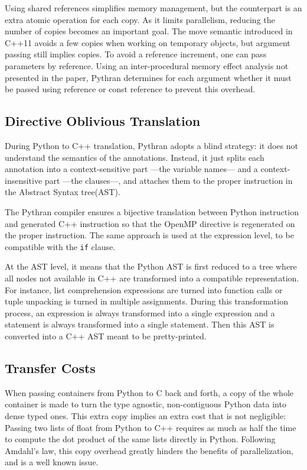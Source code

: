 \documentclass[conference]{IEEEtran}
\begin{document}
Using shared references simplifies memory management, but the counterpart is an
extra atomic operation for each copy. As it limits parallelism, reducing the
number of copies becomes an important goal. The move semantic introduced in
C++11 avoids a few copies when working on temporary objects, but argument
passing still implies copies. To avoid a reference increment, one can pass
parameters by reference. Using an inter-procedural memory effect analysis not
presented in the paper, Pythran determines for each argument whether it must be
passed using reference or const reference to prevent this overhead.

\subsection{Directive Oblivious Translation}

During Python to C++ translation, Pythran adopts a blind strategy: it does not
understand the semantics of the annotations. Instead, it just splits each
annotation into a context-sensitive part ---the variable names--- and a
context-insensitive part ---the clauses---, and attaches them to the proper
instruction in the Abstract Syntax tree(AST).

The Pythran compiler ensures a bijective translation between Python instruction
and generated C++ instruction so that the OpenMP directive is regenerated on the
proper instruction. The same approach is used at the expression level, to be
compatible with the \texttt{if} clause.

At the AST level, it means that the Python AST is first reduced to a tree where
all nodes not available in C++ are transformed into a compatible representation.
For instance, list comprehension expressions are turned into function calls or
tuple unpacking is turned in multiple assignments. During this transformation
process, an expression is always transformed into a single expression and a
statement is always transformed into a single statement. Then this AST is
converted into a C++ AST meant to be pretty-printed.


\subsection{Transfer Costs}

When passing containers from Python to C back and forth, a copy of the whole
container is made to turn the type agnostic, non-contiguous Python data into
dense typed ones. This extra copy implies an extra cost that is not negligible:
Passing two lists of float from Python to C++ requires as much as half the time
to compute the dot product of the same lists directly in Python. Following
Amdahl's law, this copy overhead greatly hinders the benefits of
parallelization, and is a well known issue.
\end{document}
